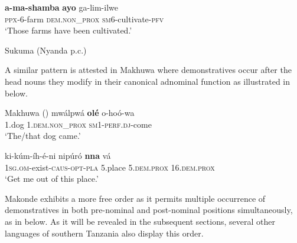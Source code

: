 \documentclass[output=paper,
            colorlinks, citecolor=brown
            ,draftmode
		  ]{langscibook}
\begin{document}
    \ex\label{ex:taji:2b} \gll    \textbf{a-ma-shamba}      \textbf{ayo}                                    ga-lim-ilwe\\
        \textsc{ppx}-6-farm          \textsc{dem.non\_prox}        \textsc{sm6}-cultivate-\textsc{pfv}\\
        \glt ‘Those farms have been cultivated.’   
    \z

\ex Sukuma (Nyanda p.c.)
    \label{ex:taji:3}
    \label{ex:taji:3a}

    \label{ex:taji:3b}
    \z
\z

A similar pattern is attested in Makhuwa where demonstratives occur after the head nouns they modify in their canonical adnominal function as illustrated in  below.

\ea Makhuwa (\citealt[184]{vanderWal2010})
    \label{ex:taji:4}
    \ea\label{ex:taji:4a} \gll  mwálpwá    \textbf{olé}                                          o-hoó-wa\\
      1.dog            1.\textsc{dem.non\_prox}        \textsc{sm1-perf.dj}-come\\
      \glt ‘The/that dog came.’

    \ex\label{ex:taji:4b} \gll  ki-kúm-íh-é-ni                                      nipúró      \textbf{nna}                        vá\\
      1\textsc{sg.om}-exist-\textsc{caus-opt-pla}    5.place    5.\textsc{dem.prox}      16.\textsc{dem.prox}\\
      \glt ‘Get me out of this place.’                              
      \z
\z

Makonde exhibits a more free order as it permits multiple occurrence of demonstratives in both pre-nominal and post-nominal positions simultaneously, as in  below. As it will be revealed in the subsequent sections, several other languages of southern Tanzania also display this order.
\end{document}
